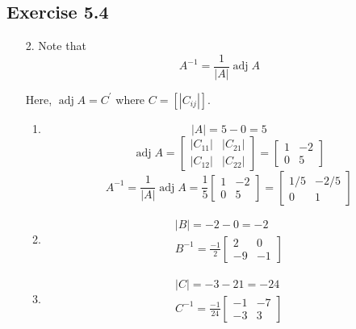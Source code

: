 \documentclass{./../../Latex/homework}
\begin{document}
\subsection*{Exercise 5.4} 

\begin{enumerate}

\item[2.] Note that $$
A^{-1}=\frac{1}{|A|} \operatorname{adj} A
$$

Here, \( \operatorname{adj} A=C^{\prime} \) where \( C=\left[\left|C_{i j}\right|\right] \).

\begin{enumerate}

\item 
$$ |A|=5-0=5 $$
$$\operatorname{adj} A=\left[\begin{array}{ll}\left|C_{11}\right| & \left|C_{21}\right| \\ \left|C_{12}\right| & \left|C_{22}\right|\end{array}\right]=\left[\begin{array}{cc}1 & -2 \\ 0 & 5\end{array}\right] $$
$$A^{-1}=\frac{1}{|A|} \operatorname{adj} A=\frac{1}{5}\left[\begin{array}{cc}1 & -2 \\ 0 & 5\end{array}\right]=\left[\begin{array}{cc}1 / 5 & -2 / 5 \\ 0 & 1\end{array}\right] $$

\item $$
\begin{array}{l}
|B|=-2-0=-2 \\
B^{-1}=\frac{-1}{2}\left[\begin{array}{rr}
2 & 0 \\
-9 & -1
\end{array}\right]
\end{array} 
$$

\item $$
\begin{array}{l}
|C|=-3-21=-24 \\
C^{-1}=\frac{-1}{24}\left[\begin{array}{cc}
-1 & -7 \\
-3 & 3
\end{array}\right]
\end{array}
$$


\end{enumerate}
\end{enumerate}
\end{document}
